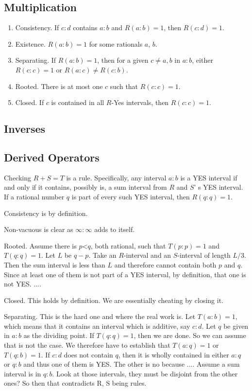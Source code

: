 \documentclass[12pt]{article}
\theoremstyle{remark}
\newcommand{\lt}{\mathord{<}}
\begin{document}
\subsection{Multiplication}

\begin{enumerate}
    \item Consistency. If $c:d$ contains $a:b$ and $R(a:b) = 1$, then $R(c:d) = 1$.
    \item Existence. $R(a:b) = 1$ for some rationals $a$, $b$.
    \item Separating. If $R(a:b)=1$, then for a given $c \neq a, b$ in $a:b$, either $R(c:c) = 1$ or $R(a:c) \neq R(c:b)$. 
    \item Rooted. There is at most one $c$ such that $R(c:c) =1$.
    \item Closed. If $c$ is contained in all $R$-Yes intervals, then $R(c:c) = 1$.
\end{enumerate}


\subsection{Inverses}



\subsection{Derived Operators}

Checking $R+S=T$ is a rule. Specifically, any interval $a:b$ is a YES interval if and only if it contains, possibly is, a sum interval from $R$ and $S$' s YES interval. If a rational number $q$ is part of every such YES interval, then $R(q:q) = 1$. 

Consistency is by definition. 

Non-vacuous is clear as $\infty:\infty$ adds to itself. 

Rooted. Assume there is $p\lt q$, both rational, such that $T(p:p)=1$ and $T(q:q) =1$. Let $L$ be $q-p$. Take an $R$-interval and an $S$-interval of length $L/3$. Then the sum interval is less than $L$ and therefore cannot contain both $p$ and $q$. Since at least one of them is not part of a YES interval, by definition, that one is not YES.  .... 

Closed. This holds by definition. We are essentially cheating by closing it. 

Separating. This is the hard one and where the real work is. Let $T(a:b) = 1$, which means that it contains an interval which is additive, say $c:d$. Let $q$ be given in $a:b$ as the dividing point. If $T(q:q) = 1$, then we are done. So we can assume that is not the case. We therefore have to establish that $T(a:q)=1$ or $T(q:b) = 1$. If $c:d$ does not contain $q$, then it is wholly contained in either $a:q$ or $q:b$ and thus one of them is YES. The other is no because .... Assume a sum interval is in $q:b$. Look at those intervals, they must be disjoint from the other ones? So then that contradicts R, S being rules. 
\end{document}
